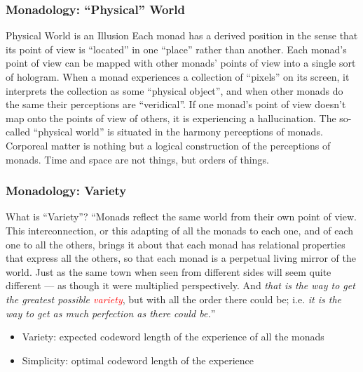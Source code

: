 \documentclass[UTF8,11pt,colorlinks,compress,openany]{beamer}%
\begin{document}
\begin{frame}\frametitle{Monadology: ``Physical'' World}
\begin{block}{Physical World is an Illusion}
Each monad has a derived position in the sense that its point of view is ``located'' in one ``place'' rather than
another. Each monad's point of view can be mapped with other monads' points of view into a single sort of hologram. When a monad experiences a collection of ``pixels'' on its screen, it interprets the collection as some ``physical object'', and when other monads do the same their perceptions are ``veridical''. If one monad's point of view doesn't map onto the points of view of others, it is experiencing a hallucination. The so-called ``physical world'' is situated in the harmony perceptions of monads. Corporeal matter is nothing but a logical construction of the perceptions of monads. Time and space are not things, but orders of things.	
\end{block}
\end{frame}

\begin{frame}\frametitle{Monadology: Variety}
\begin{block}{What is ``Variety''?}
``Monads reflect the same world from their own point of view. This interconnection, or this adapting of all the monads to each one, and of each one to all the others, brings it about that each monad has relational properties that express all the others, so that each monad is a perpetual living mirror of the world. Just as the same town when seen from different sides will seem quite different --- as though it were multiplied perspectively. And \emph{that is the way to get the greatest possible \textcolor{red}{variety}}, but with all the order there could be; i.e. \emph{it is the way to get as much perfection as there could be.}''	
\end{block}
\begin{itemize}
	\item Variety: expected codeword length of the experience of all the monads
	\item Simplicity: optimal codeword length of the experience
\end{itemize}
\end{frame}
\end{document}
